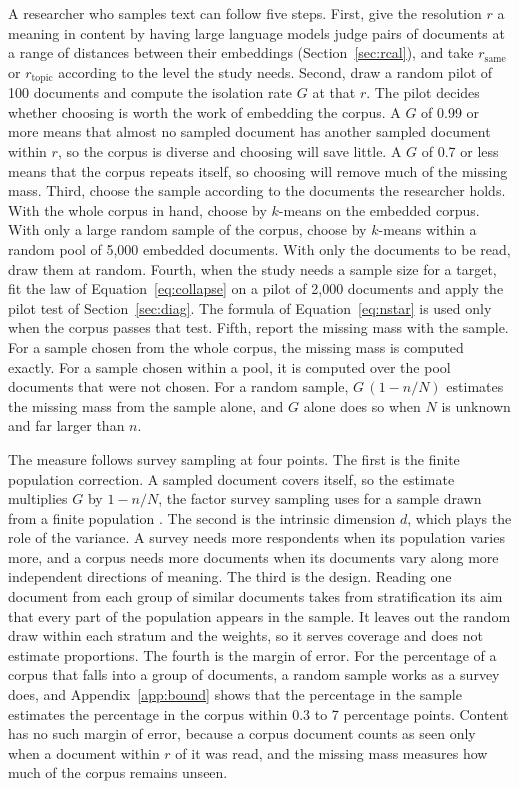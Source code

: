 A researcher who samples text can follow five steps. First, give the resolution $r$ a meaning in content by having large language models judge pairs of documents at a range of distances between their embeddings (Section~\ref{sec:rcal}), and take $r_{\mathrm{same}}$ or $r_{\mathrm{topic}}$ according to the level the study needs. Second, draw a random pilot of 100 documents and compute the isolation rate $G$ at that $r$. The pilot decides whether choosing is worth the work of embedding the corpus. A $G$ of 0.99 or more means that almost no sampled document has another sampled document within $r$, so the corpus is diverse and choosing will save little. A $G$ of 0.7 or less means that the corpus repeats itself, so choosing will remove much of the missing mass. Third, choose the sample according to the documents the researcher holds. With the whole corpus in hand, choose by $k$-means on the embedded corpus. With only a large random sample of the corpus, choose by $k$-means within a random pool of 5{,}000 embedded documents. With only the documents to be read, draw them at random. Fourth, when the study needs a sample size for a target, fit the law of Equation~\ref{eq:collapse} on a pilot of 2{,}000 documents and apply the pilot test of Section~\ref{sec:diag}. The formula of Equation~\ref{eq:nstar} is used only when the corpus passes that test. Fifth, report the missing mass with the sample. For a sample chosen from the whole corpus, the missing mass is computed exactly. For a sample chosen within a pool, it is computed over the pool documents that were not chosen. For a random sample, $G\,(1 - n/N)$ estimates the missing mass from the sample alone, and $G$ alone does so when $N$ is unknown and far larger than $n$.

The measure follows survey sampling at four points. The first is the finite population correction. A sampled document covers itself, so the estimate multiplies $G$ by $1 - n/N$, the factor survey sampling uses for a sample drawn from a finite population \citep{cochran1977}. The second is the intrinsic dimension $d$, which plays the role of the variance. A survey needs more respondents when its population varies more, and a corpus needs more documents when its documents vary along more independent directions of meaning. The third is the design. Reading one document from each group of similar documents takes from stratification \citep{kish1965} its aim that every part of the population appears in the sample. It leaves out the random draw within each stratum and the weights, so it serves coverage and does not estimate proportions. The fourth is the margin of error. For the percentage of a corpus that falls into a group of documents, a random sample works as a survey does, and Appendix~\ref{app:bound} shows that the percentage in the sample estimates the percentage in the corpus within 0.3 to 7 percentage points. Content has no such margin of error, because a corpus document counts as seen only when a document within $r$ of it was read, and the missing mass measures how much of the corpus remains unseen.

